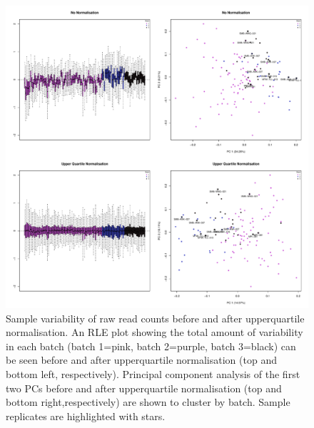\documentclass[12pt,a4paper,titlepage,twoside,openright]{book}
\begin{document}
\begin{mainmatter}
{{\begin{figure}[htb!]
\centering
\includegraphics[width=\textwidth,height=\textheight,keepaspectratio]{Figures/Normalisation_beforeandAfterUQnorm.pdf}
\caption{Sample variability of raw read counts before and after upperquartile normalisation. An RLE plot showing the total amount of variability in each batch (batch 1=pink, batch 2=purple, batch 3=black) can be seen before and after upperquartile normalisation (top and bottom left, respectively). Principal component analysis of the first two PCs before and after upperquartile normalisation (top and bottom right,respectively) are shown to cluster by batch. Sample replicates are highlighted with stars.}
\label{fig:UQ normalisation}
\end{figure}

}}
\end{mainmatter}
\end{document}
